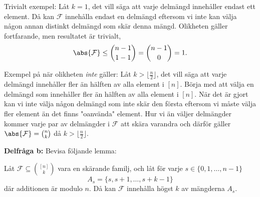 \documentclass[nobib]{tufte-handout}
\begin{document}
\begin{xca}

    Trivialt exempel: Låt $k=1$, det vill säga att varje delmängd innehåller endast ett element. Då kan $\mathcal{F}$ innehålla endast en delmängd eftersom vi inte kan välja någon annan distinkt delmängd som skär denna mängd. Olikheten gäller fortfarande, men resultatet är trivialt, $$\abs{\mathcal{F}} \leq \binom{n-1}{1-1} = \binom{n-1}{0}=1.$$
    
    Exempel på när olikheten \textit{inte} gäller: Låt $k > \lfloor \frac{n}{2} \rfloor$, det vill säga att varje delmängd innehåller fler än hälften av alla element i $[n]$. Börja med att välja en delmängd som innehåller fler än hälften av alla element i $[n]$. När det är gjort kan vi inte välja någon delmängd som inte skär den första eftersom vi måste välja fler element än det finns "oanvända" element. Hur vi än väljer delmängder kommer varje par av delmängder i $\mathcal{F}$ att skära varandra och därför gäller $\abs{\mathcal{F}} = \binom{n}{k}$ då $k > \lfloor \frac{n}{2} \rfloor$. 
    

    \hfill \break 
    \textbf{Delfråga b:} Bevisa följande lemma:

    \begin{lemma}
        Låt $\mathcal{F} \subseteq \binom{[n]}{k}$ vara en skärande familj, och låt för varje $s \in \{0,1,\ldots,n-1\}$
        $$A_s = \{s, s+1, \ldots, s + k - 1\}$$
        där additionen är modulo $n$. Då kan $\mathcal{F}$ innehålla högst $k$ av mängderna $A_s$.
    \end{lemma}


\end{xca}
\end{document}
